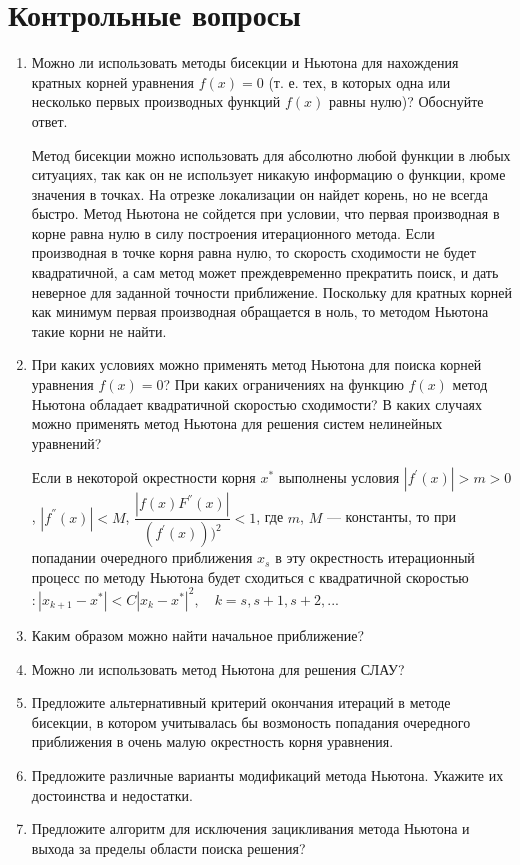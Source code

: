 \documentclass[12pt, a4paper]{article}
\begin{document}
\section{Контрольные вопросы}
\begin{enumerate}
\item Можно ли использовать методы бисекции и Ньютона для нахождения кратных корней уравнения $f(x) = 0$ (т. е. тех, в которых одна или несколько первых производных функций $f(x)$ равны нулю)? Обоснуйте ответ.

Метод бисекции можно использовать для абсолютно любой функции в любых ситуациях, так как он не использует никакую информацию о функции, кроме значения в точках. На отрезке локализации он найдет корень, но не всегда быстро. Метод Ньютона не сойдется при условии, что первая производная в корне равна нулю в силу построения итерационного метода. Если производная в точке корня равна нулю, то скорость сходимости не будет квадратичной, а сам метод может преждевременно прекратить поиск, и дать неверное для заданной точности приближение. Поскольку для кратных корней как минимум первая производная обращается в ноль, то методом Ньютона такие корни не найти.

\item При каких условиях можно применять метод Ньютона для поиска корней уравнения $f(x) = 0$? При каких ограничениях на функцию $f(x)$ метод Ньютона обладает квадратичной скоростью сходимости? В каких случаях можно применять метод Ньютона для решения систем нелинейных уравнений?

Если в некоторой окрестности корня $x^*$ выполнены условия $|f^'(x)| > m > 0$, $|f^{''}(x)|< M$, $\dfrac{|f(x)F^{''}(x)|}{(f^'(x)))^2} < 1$, где $m$, $M$ --- константы, то при попадании очередного приближения $x_s$ в эту окрестность итерационный процесс по методу Ньютона будет сходиться с квадратичной скоростью$\colon |x_{k+1} - x^*| < C |x_k - x^*|^2,\quad k = s, s + 1, s + 2, ...$



\item Каким образом можно найти начальное приближение?

\item Можно ли использовать метод Ньютона для решения СЛАУ?

\item Предложите альтернативный критерий окончания итераций в методе бисекции, в котором учитывалась бы возмоность попадания очередного приближения в очень малую окрестность корня уравнения.

\item Предложите различные варианты модификаций метода Ньютона. Укажите их достоинства и недостатки.

\item Предложите алгоритм для исключения зацикливания метода Ньютона и выхода за пределы области поиска решения?
\end{enumerate}
\end{document}
